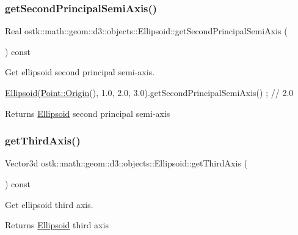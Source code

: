 \subsubsection{\texorpdfstring{get\+Second\+Principal\+Semi\+Axis()}{getSecondPrincipalSemiAxis()}}
{\footnotesize\ttfamily Real ostk\+::math\+::geom\+::d3\+::objects\+::\+Ellipsoid\+::get\+Second\+Principal\+Semi\+Axis (\begin{DoxyParamCaption}{ }\end{DoxyParamCaption}) const}



Get ellipsoid second principal semi-\/axis. 


\begin{DoxyCode}
\hyperlink{classostk_1_1math_1_1geom_1_1d3_1_1objects_1_1_ellipsoid_acd84276f65a14db12623402a411712b7}{Ellipsoid}(\hyperlink{classostk_1_1math_1_1geom_1_1d3_1_1objects_1_1_point_a079c199f08b015d456d02728a71b534c}{Point::Origin}(), 1.0, 2.0, 3.0).getSecondPrincipalSemiAxis() ; \textcolor{comment}{// 2.0}
\end{DoxyCode}


\begin{DoxyReturn}{Returns}
\hyperlink{classostk_1_1math_1_1geom_1_1d3_1_1objects_1_1_ellipsoid}{Ellipsoid} second principal semi-\/axis 
\end{DoxyReturn}
\mbox{\label{classostk_1_1math_1_1geom_1_1d3_1_1objects_1_1_ellipsoid_a2e12dada2181d15c8cf4cef2abf3d2ea}} 
\subsubsection{\texorpdfstring{get\+Third\+Axis()}{getThirdAxis()}}
{\footnotesize\ttfamily Vector3d ostk\+::math\+::geom\+::d3\+::objects\+::\+Ellipsoid\+::get\+Third\+Axis (\begin{DoxyParamCaption}{ }\end{DoxyParamCaption}) const}



Get ellipsoid third axis. 

\begin{DoxyReturn}{Returns}
\hyperlink{classostk_1_1math_1_1geom_1_1d3_1_1objects_1_1_ellipsoid}{Ellipsoid} third axis 
\end{DoxyReturn}
\mbox{\label{classostk_1_1math_1_1geom_1_1d3_1_1objects_1_1_ellipsoid_aa0439388600dc3b6dc93d26402ae2d6d}} 

